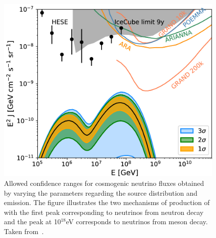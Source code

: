 \begin{figure}[t!]
  \centering
  \includegraphics[width=14.5cm]{thesis_figures/CRnNu/apjab05cef9_hr.jpg}
  \caption{Allowed confidence ranges for cosmogenic neutrino fluxes obtained by varying the parameters regarding the source distribution and emission. The figure illustrates the two mechanisms of production of with the first peak corresponding to neutrinos from neutron decay and the peak at 10$^{18}$eV corresponds to neutrinos from meson decay. Taken from~\cite{Heinze:2019jou}.}
  \label{fig:model_nu_auger_mixed}
\end{figure}

